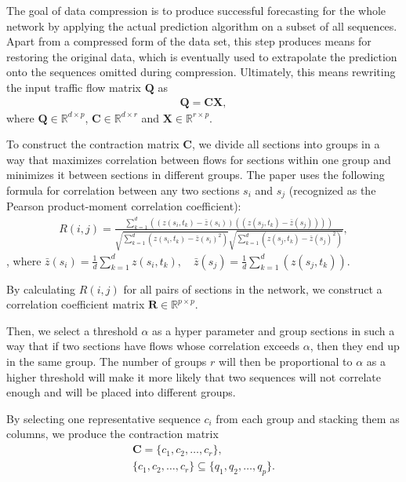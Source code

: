 The goal of data compression is to produce successful forecasting for the whole
network by applying the actual prediction algorithm on a subset of all 
sequences. Apart from a compressed form of the data set, this step produces
means for restoring the original data, which is eventually used to extrapolate
the prediction onto the sequences omitted during compression. Ultimately, this
means rewriting the input traffic flow matrix $\mathbf{Q}$ as
\begin{equation}
	\begin{aligned}
		\mathbf{Q}=\mathbf{C}\mathbf{X},
	\end{aligned}
	\label{eq:Q}
\end{equation}
where $\mathbf{Q}\in\mathbb{R}^{d\times
p}$, $\mathbf{C}\in\mathbb{R}^{d\times
r}$ and $\mathbf{X}\in\mathbb{R}^{r\times p}$.

To construct the contraction matrix $\mathbf{C}$, we divide all sections into
groups in a way that maximizes  correlation between flows for sections within
one group and minimizes it between sections in different groups. The paper uses 
the following formula for correlation between any two sections $s_i$ and $s_j$
(recognized as the Pearson product-moment correlation coefficient):
\begin{equation}
	\begin{aligned}
		R(i,j)=\frac{\sum_{k=1}^d((z(s_i,t_k)-\bar{z}(s_i))((z(s_j,t_k)-\bar{z}(s_j))))}{\sqrt{\sum_{k=1}^d(z(s_i,t_k)-\bar{z}(s_i)^2)}\sqrt{\sum_{k=1}^d(z(s_j,t_k)-\bar{z}(s_j)^2)}},
	\end{aligned}
	\label{eq:R_i_j}
\end{equation},
where
$\bar{z}(s_i)=\frac{1}{d}\sum_{k=1}^dz(s_i,t_k),\quad\bar{z}(s_j)=\frac{1}{d}\sum_{k=1}^d(z(s_j,t_k)).$

By calculating $R(i,j)$ for all pairs of sections in the network, we construct 
a correlation coefficient matrix $\mathbf{R}\in\mathbb{R}^{p\times p}$.

Then, we select a threshold $\alpha$ as a hyper parameter and group sections
in such a way that if two sections have flows whose correlation exceeds
$\alpha$, then they end up in the same group. The number of groups $r$ will then
be proportional to $\alpha$ as a higher threshold will make it more likely that
two sequences will not correlate enough and will be placed into different
groups.

By selecting one representative sequence $c_i$ from each group and stacking 
them as columns, we produce the contraction matrix
\begin{equation}
	\begin{gathered}
		\mathbf{C}=\{c_1,c_2,\ldots,c_r\},\\
		\{c_1,c_2,\ldots,c_r\}\subseteq\{q_1,q_2,\ldots,q_p\}.
	\end{gathered}
	\label{eq:C}
\end{equation}

